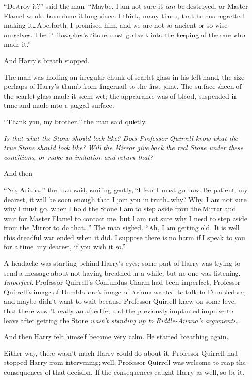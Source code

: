 “Destroy it?” said the man. “Maybe. I am not sure it \emph{can} be destroyed, or Master Flamel would have done it long since. I think, many times, that he has regretted making it…Aberforth, I promised him, and we are not so ancient or so wise ourselves. The Philosopher’s Stone must go back into the keeping of the one who made it.”

And Harry’s breath stopped.

The man was holding an irregular chunk of scarlet glass in his left hand, the size perhaps of Harry’s thumb from fingernail to the first joint. The surface sheen of the scarlet glass made it seem wet; the appearance was of blood, suspended in time and made into a jagged surface.

“Thank you, my brother,” the man said quietly.

\emph{Is that what the Stone should look like? Does Professor Quirrell know what the true Stone should look like? Will the Mirror give back the real Stone under these conditions, or make an imitation and return that?}

And then—

“No, Ariana,” the man said, smiling gently, “I fear I must go now. Be patient, my dearest, it will be soon enough that I join you in truth…why? Why, I am not sure why I must go…when I hold the Stone I am to step aside from the Mirror and wait for Master Flamel to contact me, but I am not sure why I need to step aside from the Mirror to do that…” The man sighed. “Ah, I am getting old. It is well this dreadful war ended when it did. I suppose there is no harm if I speak to you for a time, my dearest, if you wish it so.”

A headache was starting behind Harry’s eyes; some part of Harry was trying to send a message about not having breathed in a while, but no-one was listening. \emph{Imperfect}, Professor Quirrell’s Confundus Charm had been imperfect, Professor Quirrell’s image of Dumbledore’s image of Ariana wanted to talk to Dumbledore, and maybe didn’t want to wait because Professor Quirrell knew on some level that there wasn’t really an afterlife, and the previously implanted impulse to leave after getting the Stone \emph{wasn’t standing up to Riddle-Ariana’s arguments…}

And then Harry felt himself become very calm. He started breathing again.

Either way, there wasn’t much Harry could do about it. Professor Quirrell had stopped Harry from intervening; well, Professor Quirrell was welcome to reap the consequences of that decision. If the consequences caught Harry as well, so be it.

